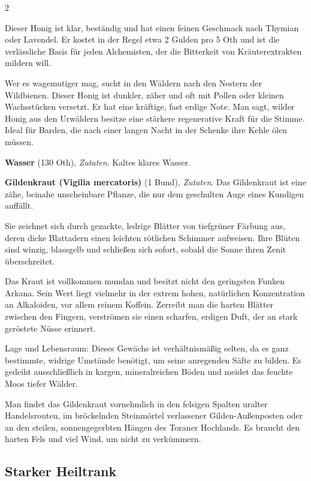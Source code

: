\begin{multicols}{2}
\begin{denseitemize}
Dieser Honig ist klar, beständig und hat einen feinen Geschmack nach Thymian oder Lavendel. Er kostet in der Regel etwa 2 Gulden pro 5 Oth und ist die verlässliche Basis für jeden Alchemisten, der die Bitterkeit von Kräuterextrakten mildern will.

Wer es wagemutiger mag, sucht in den Wäldern nach den Nestern der Wildbienen. Dieser Honig ist dunkler, zäher und oft mit Pollen oder kleinen Wachsstücken versetzt. Er hat eine kräftige, fast erdige Note. Man sagt, wilder Honig aus den Urwäldern besitze eine stärkere regenerative Kraft für die Stimme. Ideal für Barden, die nach einer langen Nacht in der Schenke ihre Kehle ölen müssen.
        \item \textbf{Wasser} (130 Oth), \textit{Zutaten}.
        Kaltes klares Wasser.
        \item \textbf{Gildenkraut (Vigilia mercatoris)} (1 Bund), \textit{Zutaten}.
        Das Gildenkraut ist eine zähe, beinahe unscheinbare Pflanze, die nur dem geschulten Auge eines Kundigen auffällt.

Sie zeichnet sich durch gezackte, ledrige Blätter von tiefgrüner Färbung aus, deren dicke Blattadern einen leichten rötlichen Schimmer aufweisen. Ihre Blüten sind winzig, blassgelb und schließen sich sofort, sobald die Sonne ihren Zenit überschreitet.

Das Kraut ist vollkommen mundan und besitzt nicht den geringsten Funken Arkana. Sein Wert liegt vielmehr in der extrem hohen, natürlichen Konzentration an Alkaloiden, vor allem reinem Koffein. Zerreibt man die harten Blätter zwischen den Fingern, verströmen sie einen scharfen, erdigen Duft, der an stark geröstete Nüsse erinnert.

Lage und Lebensraum:
Dieses Gewächs ist verhältnismäßig selten, da es ganz bestimmte, widrige Umstände benötigt, um seine anregenden Säfte zu bilden. Es gedeiht ausschließlich in kargen, mineralreichen Böden und meidet das feuchte Moos tiefer Wälder.

Man findet das Gildenkraut vornehmlich in den felsigen Spalten uralter Handelsrouten, im bröckelnden Steinmörtel verlassener Gilden-Außenposten oder an den steilen, sonnengegerbten Hängen des Toraner Hochlands. Es braucht den harten Fels und viel Wind, um nicht zu verkümmern.
    \end{denseitemize}


    \subsection*{Starker Heiltrank}


\end{multicols}
